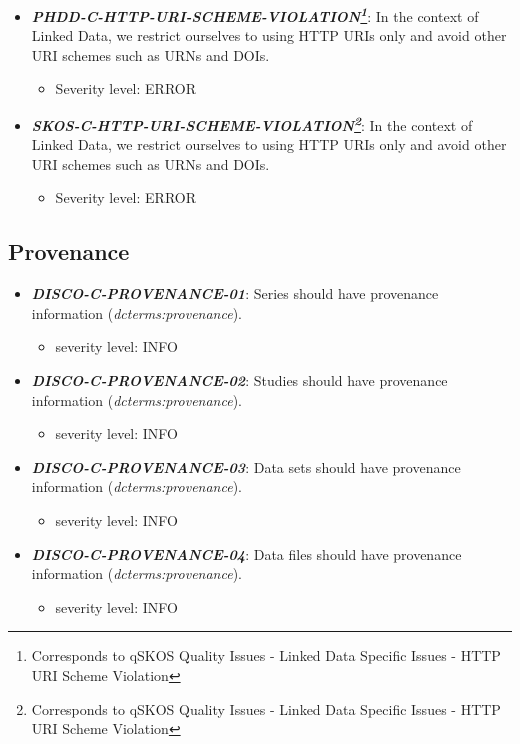\documentclass{llncs}
\begin{document}
\begin{itemize}
	\item \textbf{\em PHDD-C-HTTP-URI-SCHEME-VIOLATION\footnote{Corresponds to qSKOS Quality Issues - Linked Data Specific Issues - HTTP URI Scheme Violation}}: 
	In the context of Linked Data, we restrict ourselves to using HTTP URIs only and avoid other URI schemes such as URNs and DOIs.
	\begin{itemize}
		\item Severity level: ERROR
	\end{itemize}
\end{itemize}

\begin{itemize}
	\item \textbf{\em SKOS-C-HTTP-URI-SCHEME-VIOLATION\footnote{Corresponds to qSKOS Quality Issues - Linked Data Specific Issues - HTTP URI Scheme Violation}}: 
	In the context of Linked Data, we restrict ourselves to using HTTP URIs only and avoid other URI schemes such as URNs and DOIs.
	\begin{itemize}
		\item Severity level: ERROR
	\end{itemize}
\end{itemize}

\subsection{Provenance}

\begin{itemize}
	\item \textbf{{\em DISCO-C-PROVENANCE-01}}: 
	Series should have provenance information (\emph{dcterms:provenance}).
	\begin{itemize}
		\item severity level: INFO
	\end{itemize}
	\item \textbf{{\em DISCO-C-PROVENANCE-02}}: 
	Studies should have provenance information (\emph{dcterms:provenance}).
	\begin{itemize}
		\item severity level: INFO
	\end{itemize}
	\item \textbf{{\em DISCO-C-PROVENANCE-03}}: 
	Data sets should have provenance information (\emph{dcterms:provenance}).
	\begin{itemize}
		\item severity level: INFO
	\end{itemize}
	\item \textbf{{\em DISCO-C-PROVENANCE-04}}: 
	Data files should have provenance information (\emph{dcterms:provenance}).
	\begin{itemize}
		\item severity level: INFO
	\end{itemize}
\end{itemize} 

{}

\setcounter{tocdepth}{1}
\end{document}
